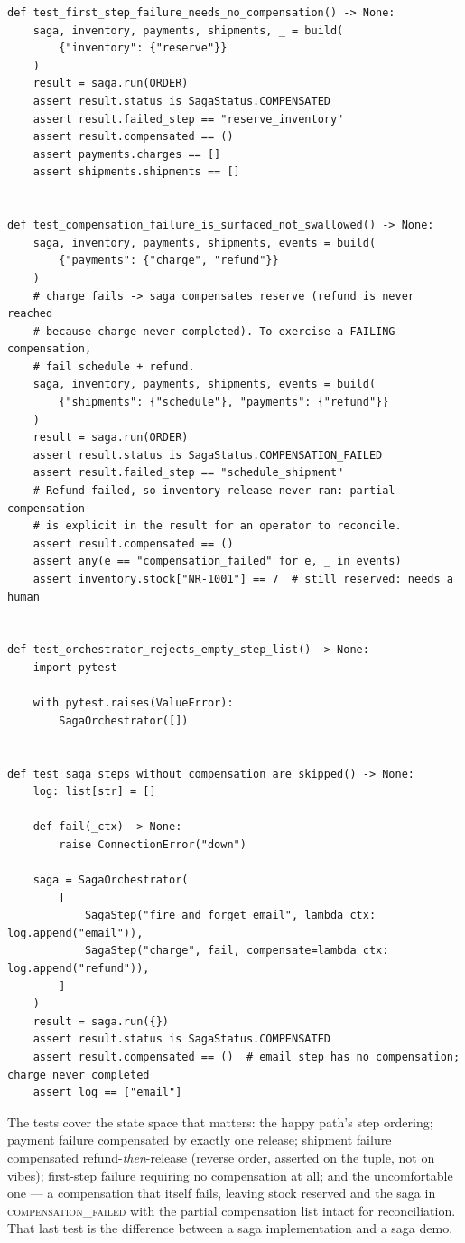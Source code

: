 \begin{verbatim}
def test_first_step_failure_needs_no_compensation() -> None:
    saga, inventory, payments, shipments, _ = build(
        {"inventory": {"reserve"}}
    )
    result = saga.run(ORDER)
    assert result.status is SagaStatus.COMPENSATED
    assert result.failed_step == "reserve_inventory"
    assert result.compensated == ()
    assert payments.charges == []
    assert shipments.shipments == []


def test_compensation_failure_is_surfaced_not_swallowed() -> None:
    saga, inventory, payments, shipments, events = build(
        {"payments": {"charge", "refund"}}
    )
    # charge fails -> saga compensates reserve (refund is never reached
    # because charge never completed). To exercise a FAILING compensation,
    # fail schedule + refund.
    saga, inventory, payments, shipments, events = build(
        {"shipments": {"schedule"}, "payments": {"refund"}}
    )
    result = saga.run(ORDER)
    assert result.status is SagaStatus.COMPENSATION_FAILED
    assert result.failed_step == "schedule_shipment"
    # Refund failed, so inventory release never ran: partial compensation
    # is explicit in the result for an operator to reconcile.
    assert result.compensated == ()
    assert any(e == "compensation_failed" for e, _ in events)
    assert inventory.stock["NR-1001"] == 7  # still reserved: needs a human


def test_orchestrator_rejects_empty_step_list() -> None:
    import pytest

    with pytest.raises(ValueError):
        SagaOrchestrator([])


def test_saga_steps_without_compensation_are_skipped() -> None:
    log: list[str] = []

    def fail(_ctx) -> None:
        raise ConnectionError("down")

    saga = SagaOrchestrator(
        [
            SagaStep("fire_and_forget_email", lambda ctx: log.append("email")),
            SagaStep("charge", fail, compensate=lambda ctx: log.append("refund")),
        ]
    )
    result = saga.run({})
    assert result.status is SagaStatus.COMPENSATED
    assert result.compensated == ()  # email step has no compensation; charge never completed
    assert log == ["email"]
\end{verbatim}

The tests cover the state space that matters: the happy path's step
ordering; payment failure compensated by exactly one release; shipment
failure compensated refund-\emph{then}-release (reverse order, asserted on
the tuple, not on vibes); first-step failure requiring no compensation at
all; and the uncomfortable one --- a compensation that itself fails,
leaving stock reserved and the saga in \textsc{compensation\_failed} with
the partial compensation list intact for reconciliation. That last test is
the difference between a saga implementation and a saga demo.

